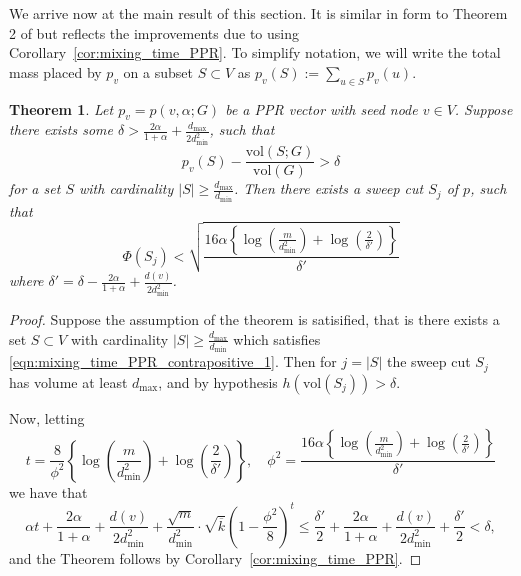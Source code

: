 \documentclass[11pt,twoside]{article}
\newtheorem{theorem}{Theorem}
\newcommand{\set}[1]{\left\{#1\right\}}
\newcommand{\vol}{\mathrm{vol}}
\newcommand{\abs}[1]{\left \lvert #1 \right \rvert}
\newcommand{\1}{\mathbf{1}}
\begin{document}
We arrive now at the main result of this section. It is similar in form to Theorem 2 of \citet{andersen2006} but reflects the improvements due to using Corollary~\ref{cor:mixing_time_PPR}. To simplify notation, we will write the total mass placed by $p_v$ on a subset $S \subset V$ as $p_v(S) := \sum_{u \in S} p_v(u)$.
\begin{theorem}
	\label{thm:mixing_time_PPR_contrapositive}
	Let $p_v = p(v,\alpha;G)$ be a PPR vector with seed node $v \in V$. Suppose there exists some $\delta > \frac{2\alpha}{1 + \alpha} + \frac{d_{\max}}{2d_{\min}^2}$, such that
	\begin{equation}
	\label{eqn:mixing_time_PPR_contrapositive_1}
	p_v(S) - \frac{\vol(S;G)}{\vol(G)} > \delta
	\end{equation}
	for a set $S$ with cardinality $\abs{S} \geq \frac{d_{\max}}{d_{\min}}$. Then there exists a sweep cut $S_j$ of $p$, such that
	\begin{equation*}
	\Phi(S_j) < \sqrt{\frac{16\alpha\left\{\log\left(\frac{m}{d_{\min}^2}\right) + \log\left(\frac{2}{\delta'}\right)\right\}}{\delta'}}
	\end{equation*}
	where $\delta' = \delta - \frac{2\alpha}{1 + \alpha} + \frac{d(v)}{2d_{\min}^2}$. 
\end{theorem}
\begin{proof}
	Suppose the assumption of the theorem is satisified, that is there exists a set $S \subset V$ with cardinality $\abs{S} \geq \frac{d_{\max}}{d_{\min}}$ which satisfies \eqref{eqn:mixing_time_PPR_contrapositive_1}. Then for $j = \abs{S}$ the sweep cut $S_j$ has volume at least $d_{\max}$, and by hypothesis $h(\vol(S_j)) >  \delta$.
	
	Now, letting
	\begin{equation*}
	t = \frac{8}{\phi^2}\left\{\log\left(\frac{m}{d_{\min}^2}\right) + \log\left(\frac{2}{\delta'}\right)\right\}, \quad \phi^2 = \frac{16\alpha\set{\log\left(\frac{m}{d_{\min}^2}\right) + \log(\frac{2}{\delta'})}}{\delta'}
	\end{equation*}
	we have that
	\begin{equation*}
	\alpha t + \frac{2\alpha}{1 + \alpha} + \frac{d(v)}{2d_{\min}^2} + \frac{\sqrt{m}}{d_{\min}^2} \cdot \sqrt{\overline{k}} \left(1 - \frac{\phi^2}{8}\right)^{t} \leq \frac{\delta'}{2} + \frac{2\alpha}{1 + \alpha} + \frac{d(v)}{2d_{\min}^2} + \frac{\delta'}{2} < \delta,
	\end{equation*}
	and the Theorem follows by Corollary~\ref{cor:mixing_time_PPR}.
\end{proof}
\end{document}
